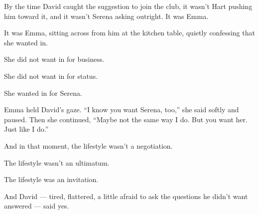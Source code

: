\medskip

By the time David caught the suggestion to join the club, it wasn’t Hart pushing him toward it, and it wasn’t Serena asking 
outright. It was Emma.  

It was Emma, sitting across from him at the kitchen table, quietly confessing that she wanted in.  

She did not want in for business.  

She did not want in for status.  

She wanted in for Serena.

Emma held David's gaze.  ``I know you want Serena, too,'' she said softly and paused.  
Then she continued, ``Maybe not the same way I do. But you want her. Just like I do.''

And in that moment, the lifestyle wasn’t a negotiation.  

The lifestyle wasn’t an ultimatum.  

The lifestyle was an invitation.

And David --- tired, flattered, a little afraid to ask the questions he didn’t want answered ---  
said yes.

\medskip


